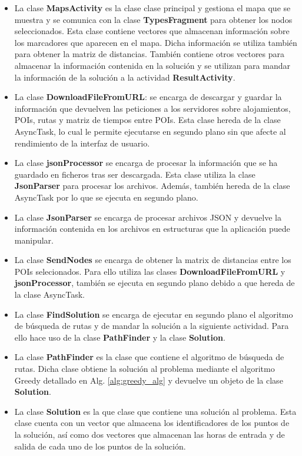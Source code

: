\begin{itemize}
	\item La clase \textbf{MapsActivity} es la clase clase principal y gestiona el mapa que se muestra y se comunica con la clase \textbf{TypesFragment} para obtener los nodos seleccionados. Esta clase contiene vectores que almacenan información sobre los marcadores que aparecen en el mapa. Dicha información se utiliza también para obtener la matriz de distancias. También contiene otros vectores para almacenar la información contenida en la solución y se utilizan para mandar la información de la solución a la actividad \textbf{ResultActivity}.
	\item La clase \textbf{DownloadFileFromURL}: se encarga de descargar y guardar la información que devuelven las peticiones a los servidores sobre alojamientos, POIs, rutas y matriz de tiempos entre POIs. Esta clase hereda de la clase AsyncTask, lo cual le permite ejecutarse en segundo plano sin que afecte al rendimiento de la interfaz de usuario.
	\item La clase \textbf{jsonProcessor} se encarga de procesar la información que se ha guardado en ficheros tras ser descargada. Esta clase utiliza la clase \textbf{JsonParser} para procesar los archivos. Además, también hereda de la clase AsyncTask por lo que se ejecuta en segundo plano.
	\item La clase \textbf{JsonParser} se encarga de procesar archivos JSON y devuelve la información contenida en los archivos en estructuras que la aplicación puede manipular.
	\item La clase \textbf{SendNodes} se encarga de obtener la matrix de distancias entre los POIs selecionados. Para ello utiliza las clases \textbf{DownloadFileFromURL} y\textbf{ jsonProcessor}, también se ejecuta en segundo plano debido a que hereda de la clase AsyncTask.
	\item La clase\textbf{ FindSolution} se encarga de ejecutar en segundo plano el algoritmo de búsqueda de rutas y de mandar la solución a la siguiente actividad. Para ello hace uso de la clase \textbf{PathFinder} y la clase \textbf{Solution}.
	\item La clase \textbf{PathFinder} es la clase que contiene el algoritmo de búsqueda de rutas. Dicha clase obtiene la solución al problema mediante el algoritmo Greedy detallado en Alg. \ref{alg:greedy_alg} y devuelve un objeto de la clase \textbf{Solution}.
	\item La clase \textbf{Solution} es la que clase que contiene una solución al problema. Esta clase cuenta con un vector que almacena los identificadores de los puntos de la solución, así como dos vectores que almacenan las horas de entrada y de salida de cada uno de los puntos de la solución.
\end{itemize}
